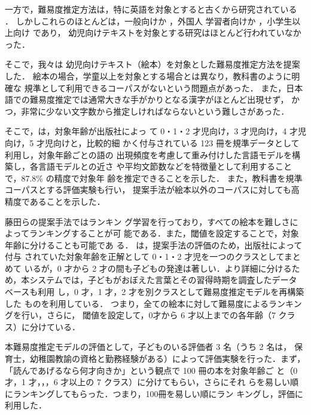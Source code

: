 \documentclass[japanese]{jnlp_1.4}
\begin{document}
一方で，難易度推定方法は，特に英語を対象とすると古くから研究されている
\cite{DuBay:2004,Benjamin:2012}．
しかしこれらのほとんどは，一般向けか \cite{Sato:2011j}，外国人
学習者向けか \cite{Petersen:Ostendorf:2O09,Lee:2011j}，小学生以上向け
 \cite{Tanaka:Tezuka:Terada:2010,Shibasaki:Tamaoka:2010j}であり，
幼児向けテキストを対象とする研究はほとんど行われていなかった．


そこで，我々は
幼児向けテキスト（絵本）を対象とした難易度推定方法を提案した\cite{Fujita:Ehon:2015j}．
絵本の場合，学童以上を対象とする場合とは異なり，教科書のように明確な
規準として利用できるコーパスがないという問題点があった．
また，日本語での難易度推定では通常大きな手がかりとなる漢字がほとんど出現せず，
かつ，非常に少ない文字数から推定しければならないという難しさがあった．

そこで，は，対象年齢が出版社によっ
て 0・1・2 才児向け，3 才児向け，4 才児向け，5 才児向けと，比較的細
かく付与されている 123 冊を規準データとして利用し，対象年齢ごとの語の
出現頻度を考慮して重み付けした言語モデルを構築し，各言語モデルとの近さ
や平均文節数などを特徴量として利用することで，87.8\% の精度で対象年
齢を推定できることを示した．
また，教科書を規準コーパスとする評価実験も行い，
提案手法が絵本以外のコーパスに対しても高精度であることを示した\cite{Fujita:etal:2015j}．

藤田らの提案手法\cite{Fujita:etal:2015j,Fujita:Ehon:2015j}ではランキン
グ学習を行っており，すべての絵本を難しさによってランキングすることが可
能である．また，閾値を設定することで，対象年齢に分けることも可能であ
る．
 は，提案手法の評価のため，出版社によって付与
されていた対象年齢を正解として 0・1・2 才児を一つのクラスとしてまとめて
いるが，0 才から 2 才の間も子どもの発達は著しい．より詳細に分けるた
め，本システムでは，子どもがおぼえた言葉とその習得時期を調査したデータ
ベース\cite{Kobayashi:Okumura:Minami:2016j}も利用
し，0 才，1 才，2 才を別クラスとして難易度推定モデルを再構築した
ものを利用している．
つまり，全ての絵本に対して難易度によるランキングを行い，さらに，
閾値を設定して，0才から 6 才以上までの各年齢（7 クラス）に分けている．

本難易度推定モデルの評価として，子どものいる評価者 3 名（うち 2 名は，
保育士，幼稚園教諭の資格と勤務経験がある）によって評価実験を行った．まず，
「読んであげるなら何才向きか」という観点で 100 冊の本を対象年齢ご
と（0 才，1 才，，，6 才以上の 7 クラス）に分けてもらい，さらにそれ
らを易しい順にランキングしてもらった．つまり，100冊を易しい順にラン
キングし，評価に利用した．
\end{document}
